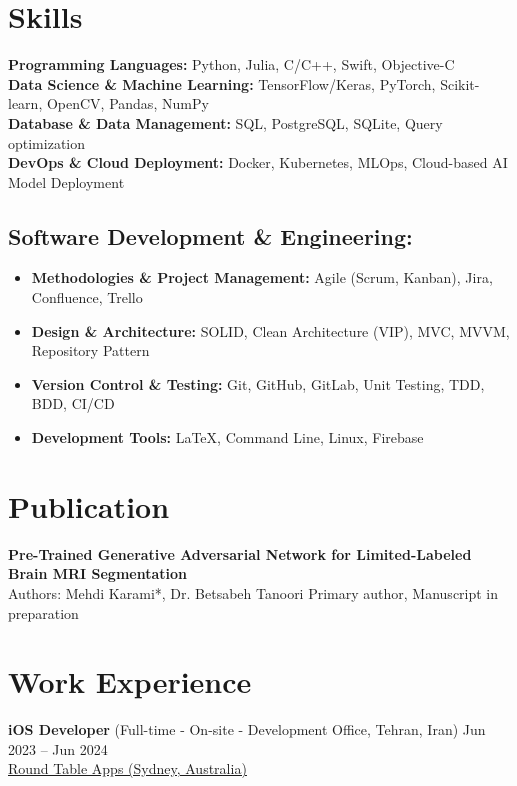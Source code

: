 \documentclass[letter,10pt]{article}
\newcommand{\customsquare}{\raisebox{0.25ex}{\scalebox{0.45}{$\blacksquare$}}}
\begin{document}
\section*{Skills}
\textbf{Programming Languages:} Python, Julia, C/C++, Swift, Objective-C \\ [5pt]
\textbf{Data Science \& Machine Learning:} TensorFlow/Keras, PyTorch, Scikit-learn, OpenCV, Pandas, NumPy \\ [5pt]
\textbf{Database \& Data Management:} SQL, PostgreSQL, SQLite, Query optimization \\ [5pt]
\textbf{DevOps \& Cloud Deployment:} Docker, Kubernetes, MLOps, Cloud-based AI Model Deployment \\ [-20pt]

\subsection*{Software Development \& Engineering:}
\vspace{5pt}
\begin{itemize}[label={\customsquare}]
    \item \textbf{Methodologies \& Project Management:} Agile (Scrum, Kanban), Jira, Confluence, Trello
    \item \textbf{Design \& Architecture:} SOLID, Clean Architecture (VIP), MVC, MVVM, Repository Pattern
    \item \textbf{Version Control \& Testing:} Git, GitHub, GitLab, Unit Testing, TDD, BDD, CI/CD
    \item \textbf{Development Tools:} LaTeX, Command Line, Linux, Firebase
\end{itemize}

\section*{Publication}
\textbf{Pre-Trained Generative Adversarial Network for Limited-Labeled Brain MRI Segmentation} \\ [5pt]
Authors: Mehdi Karami*, Dr. Betsabeh Tanoori \hfill *Primary author, Manuscript in preparation

\section*{Work Experience}
\textbf{iOS Developer} (Full-time - On-site - Development Office, Tehran, Iran) \hfill Jun 2023 -- Jun 2024 \\
\href{https://roundtableapps.com}{\underline{Round Table Apps (Sydney, Australia)}} \hfill
\end{document}
